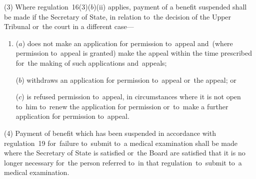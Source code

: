 \documentclass[12pt,a4paper]{article}
\begin{document}
(3) Where regulation~16(3)($b$)(ii)  applies, payment of a benefit suspended shall be made if the Secretary of State, in relation to~the decision of 
the Upper Tribunal  %
or~the court in a different case—
\begin{enumerate}\item[]
($a$) does not make an application for 
permission  %
to~appeal and~(where 
permission  %
to~appeal is granted) make the appeal within the time prescribed for~the making of such applications and~appeals;

($b$) withdraws an application for 
permission  %
to~appeal or~the appeal; or

($c$) is refused 
permission  %
to~appeal, in circumstances where it is not open to~him to~renew the application for 
permission  %
or~to~make a further application for 
permission  %
to~appeal.
\end{enumerate}

(4) Payment of benefit which has been suspended in accordance with regulation~19 for~failure to~submit to~a medical examination shall be made where the Secretary of State is satisfied 
or~the Board are satisfied  %
that it is no longer necessary for~the person referred to~in that regulation~to~submit to~a medical examination.

\end{document}
